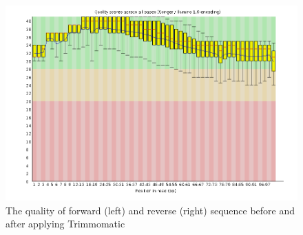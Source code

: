 \documentclass{article}
\begin{document}
\begin{figure}[h]
\includegraphics[scale=0.35]{rev_aft_trim.png}
\caption{ The quality of forward (left) and reverse (right) sequence before and after applying Trimmomatic  }
\label{saw}
\end{figure}
\end{document}
